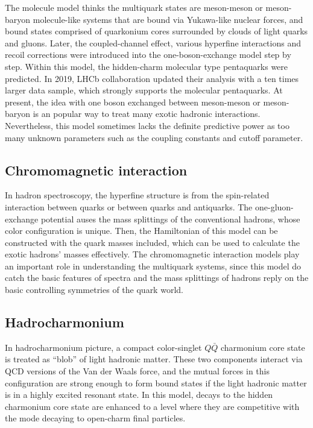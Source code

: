 The molecule model thinks the multiquark states are meson-meson or meson-baryon molecule-like systems 
that are bound via Yukawa-like nuclear forces, 
and bound states comprised of quarkonium cores surrounded by clouds of light quarks and gluons.
Later, the coupled-channel effect, various hyperfine interactions and recoil corrections were introduced into the one-boson-exchange model step by step. 
Within this model, 
the hidden-charm molecular type pentaquarks were predicted. 
In 2019, 
LHCb collaboration updated their analysis with a ten times larger data sample, 
which strongly supports the molecular pentaquarks. 
At present, 
the idea with one boson exchanged between meson-meson or meson-baryon is an popular way to treat many exotic hadronic interactions.
Nevertheless,
this model sometimes lacks the definite predictive power
as too many unknown parameters such as the coupling constants and cutoff parameter\supercite{LIU2019237}. 

\subsection{Chromomagnetic interaction}
In hadron spectroscopy,
the hyperfine structure is from the spin-related interaction between quarks or between quarks and antiquarks.
The one-gluon-exchange potential auses the mass splittings of the conventional hadrons,
whose color configuration is unique. 
Then,
the Hamiltonian of this model can be constructed with the quark masses included,
which can be used to calculate the exotic hadrons' masses effectively.
The chromomagnetic interaction models play an important role in understanding the multiquark systems,
since this model do catch the basic features of spectra and the mass splittings of hadrons reply on the basic controlling symmetries of the quark world.

\subsection{Hadrocharmonium}
In hadrocharmonium picture, 
a compact color-singlet $Q\bar{Q}$ charmonium core state is treated as “blob” of light hadronic matter. 
These two components interact via QCD versions of the Van der Waals force,
and the mutual forces in this configuration are strong enough to form bound states 
if the light hadronic matter is in a highly excited resonant state. 
In this model, 
decays to the hidden charmonium core state are enhanced to a level 
where they are competitive with the mode decaying to open-charm final particles\supercite{DUBYNSKIY200982}. 



